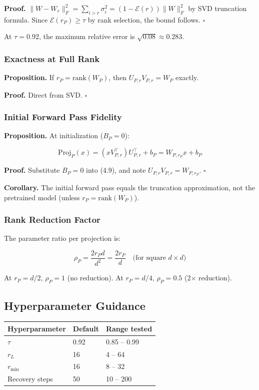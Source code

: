 \textbf{Proof.} $\|W - W_r\|_F^2 = \sum_{i > r} \sigma_i^2 = (1 - \mathcal{E}(r)) \|W\|_F^2$ by 
SVD truncation formula. Since $\mathcal{E}(r_P) \geq \tau$ by rank selection, 
the bound follows. $\square$

At $\tau = 0.92$, the maximum relative error is $\sqrt{0.08} \approx 0.283$.

\subsubsection{Exactness at Full Rank}

\textbf{Proposition.} If $r_P = \mathrm{rank}(W_P)$, then $U_{P, r} V_{P, r} = W_P$ exactly.

\textbf{Proof.} Direct from SVD. $\square$

\subsubsection{Initial Forward Pass Fidelity}

\textbf{Proposition.} At initialization ($B_P = 0$):

\[
\text{Proj}_P(x) = (x V_{P, r}^\top) U_{P, r}^\top + b_P = W_{P, r_P} x + b_P
\tag{4.12}
\]

\textbf{Proof.} Substitute $B_P = 0$ into (4.9), and note $U_{P, r} V_{P, r} = W_{P, r_P}$. 
$\square$

\textbf{Corollary.} The initial forward pass equals the truncation approximation, 
not the pretrained model (unless $r_P = \text{rank}(W_P)$).

\subsubsection{Rank Reduction Factor}

The parameter ratio per projection is:

\[
\rho_P = \frac{2 r_P d}{d^2} = \frac{2 r_P}{d} \quad \text{(for square } d \times d\text{)}
\tag{4.13}
\]

At $r_P = d/2$, $\rho_P = 1$ (no reduction). At $r_P = d/4$, $\rho_P = 0.5$ (2$\times$ reduction).

\subsection{Hyperparameter Guidance}

\begin{table}[H]
\centering
\small
\begin{tabular}{lll}
\toprule
\textbf{Hyperparameter} & \textbf{Default} & \textbf{Range tested} \\
\midrule
$\tau$ & 0.92 & 0.85 -- 0.99 \\
$r_L$ & 16 & 4 -- 64 \\
$r_\text{min}$ & 16 & 8 -- 32 \\
Recovery steps & 50 & 10 -- 200 \\
\bottomrule
\end{tabular}
\end{table}

